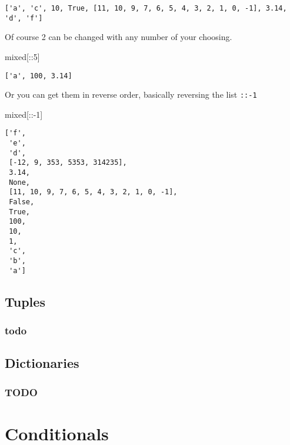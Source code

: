 \documentclass[
  letterpaper,
  DIV=11,
  numbers=noendperiod]{scrreprt}
\newenvironment{Shaded}{\begin{snugshade}}{\end{snugshade}}
\newcommand{\DecValTok}[1]{\textcolor[rgb]{0.68,0.00,0.00}{#1}}
\newcommand{\NormalTok}[1]{\textcolor[rgb]{0.00,0.23,0.31}{#1}}
\newcommand{\OperatorTok}[1]{\textcolor[rgb]{0.37,0.37,0.37}{#1}}
\begin{document}
\begin{verbatim}
['a', 'c', 10, True, [11, 10, 9, 7, 6, 5, 4, 3, 2, 1, 0, -1], 3.14, 'd', 'f']
\end{verbatim}

Of course 2 can be changed with any number of your choosing.

\begin{Shaded}
\begin{Highlighting}[]
\NormalTok{mixed[::}\DecValTok{5}\NormalTok{]}
\end{Highlighting}
\end{Shaded}

\begin{verbatim}
['a', 100, 3.14]
\end{verbatim}

Or you can get them in reverse order, basically reversing the list
\texttt{::-1}

\begin{Shaded}
\begin{Highlighting}[]
\NormalTok{mixed[::}\OperatorTok{{-}}\DecValTok{1}\NormalTok{]}
\end{Highlighting}
\end{Shaded}

\begin{verbatim}
['f',
 'e',
 'd',
 [-12, 9, 353, 5353, 314235],
 3.14,
 None,
 [11, 10, 9, 7, 6, 5, 4, 3, 2, 1, 0, -1],
 False,
 True,
 100,
 10,
 1,
 'c',
 'b',
 'a']
\end{verbatim}

\chapter{Tuples}\label{tuples}

\section{todo}\label{todo}

\chapter{Dictionaries}\label{dictionaries}

\section{TODO}\label{todo-1}

\part{Conditionals}
\end{document}

